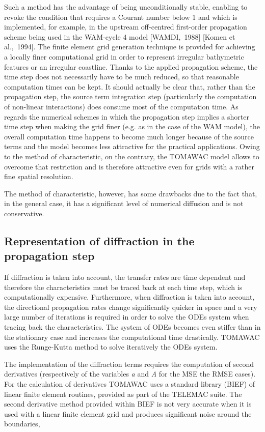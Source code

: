  Such a method has the advantage of being unconditionally stable, enabling to revoke the condition that requires a Courant number below 1 and which is implemented, for example, in the upstream off-centred first-order propagation scheme being used in the WAM-cycle 4 model [WAMDI,~1988] [Komen et al.,~1994]. The finite element grid generation technique is provided for achieving a locally finer computational grid in order to represent irregular bathymetric features or an irregular coastline. Thanks to the applied propagation scheme, the time step does not necessarily have to be much reduced, so that reasonable computation times can be kept. It should actually be clear that, rather than the propagation step, the source term integration step (particularly the computation of non-linear interactions) does consume most of the computation time. As regards the numerical schemes in which the propagation step implies a shorter time step when making the grid finer (e.g. as in the case of the WAM model), the overall computation time happens to become much longer because of the source terms and the model becomes less attractive for the practical applications. Owing to the method of characteristic, on the contrary, the TOMAWAC model allows to overcome that restriction and is therefore attractive even for grids with a rather fine spatial resolution.

 The method of characteristic, however, has some drawbacks due to the fact that, in the general case, it has a significant level of numerical diffusion and is not conservative.


\subsection{ Representation of diffraction in the propagation step}

 If diffraction is taken into account, the transfer rates are time dependent and therefore the characteristics must be traced back at each time step, which is computationally expensive. Furthermore, when diffraction is taken into account, the directional propagation rates change significantly quicker in space and a very large number of iterations is required in order to solve the ODEs system when tracing back the characteristics. The system of ODEs becomes even stiffer than in the stationary case and increases the computational time drastically. TOMAWAC uses the Runge-Kutta method to solve iteratively the ODEs system.

 The implementation of the diffraction terms requires the computation of second derivatives (respectively of the variables \textit{a} and \textit{A} for the MSE the RMSE cases). For the calculation of derivatives TOMAWAC uses a standard library (BIEF) of linear finite element routines, provided as part of the TELEMAC suite. The second derivative method provided within BIEF is not very accurate when it is used with a linear finite element grid and produces significant noise around the boundaries,

